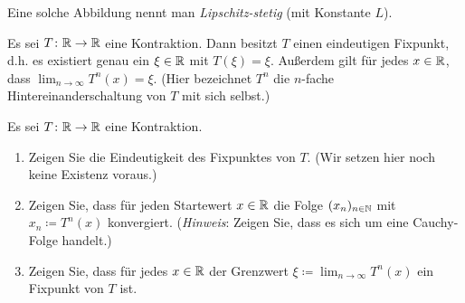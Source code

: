 \documentclass[a4paper,10pt]{article}
\begin{document}
\begin{bem}
 Eine solche Abbildung nennt man \emph{Lipschitz-stetig} (mit Konstante $L$).
\end{bem}


\begin{thrm}
 Es sei $T \colon \mathbb{R} \to \mathbb{R}$ eine Kontraktion. Dann besitzt $T$ einen eindeutigen Fixpunkt, d.h. es existiert genau ein $\xi \in \mathbb{R}$ mit $T(\xi) = \xi$. Außerdem gilt für jedes $x \in \mathbb{R}$, dass $\lim_{n \to \infty} T^n(x) = \xi$. (Hier bezeichnet $T^n$ die $n$-fache Hintereinanderschaltung von $T$ mit sich selbst.)
\end{thrm}


\begin{question}
 Es sei $T \colon \mathbb{R} \to \mathbb{R}$ eine Kontraktion.
 \begin{enumerate}
  \item
   Zeigen Sie die Eindeutigkeit des Fixpunktes von $T$. (Wir setzen hier noch keine Existenz voraus.)
  \item
   Zeigen Sie, dass für jeden Startewert $x \in \mathbb{R}$ die Folge $(x_n)_{n \in \mathbb{N}}$ mit $x_n \coloneqq T^n(x)$ konvergiert. (\emph{Hinweis}: Zeigen Sie, dass es sich um eine Cauchy-Folge handelt.)
  \item
   Zeigen Sie, dass für jedes $x \in \mathbb{R}$ der Grenzwert $\xi \coloneqq \lim_{n \to \infty} T^n(x)$ ein Fixpunkt von $T$ ist.
 \end{enumerate}
\end{question}
\end{document}
